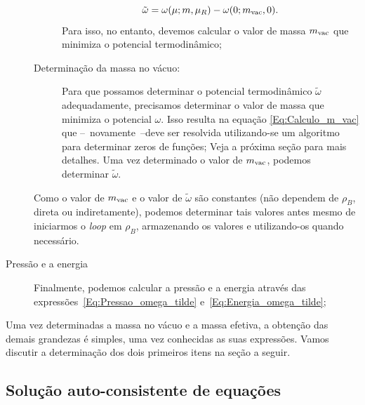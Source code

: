 \begin{description}
\begin{description}
							\begin{equation}
					\tilde\omega = \omega(\mu;m,\mu_R) - \omega(0;m_{\rm{vac}},0).
				\end{equation}
				Para isso, no entanto, devemos calcular o valor de massa $m_{\rm{vac}}$ que minimiza o potencial termodinâmico;
			\item[Determinação da massa no vácuo:] Para que possamos determinar o potencial termodinâmico $\tilde\omega$ adequadamente, precisamos determinar o valor de massa que minimiza o potencial $\omega$. Isso resulta na equação \ref{Eq:Calculo_m_vac} que --~novamente~--deve ser resolvida utilizando-se um algoritmo para determinar zeros de funções; Veja a próxima seção para mais detalhes. Uma vez determinado o valor de $m_{\rm{vac}}$, podemos determinar $\tilde\omega$.
		\end{description}	
		Como o valor de $m_{\rm{vac}}$ e o valor de $\tilde\omega$ são constantes (não dependem de $\rho_B$, direta ou indiretamente), podemos determinar tais valores antes mesmo de iniciarmos o \emph{loop} em $\rho_B$, armazenando os valores e utilizando-os quando necessário.
	\item[Pressão e a energia] Finalmente, podemos calcular a pressão e a energia através das expressões~\eqref{Eq:Pressao_omega_tilde} e~\eqref{Eq:Energia_omega_tilde};
\end{description}
%
Uma vez determinadas a massa no vácuo e a massa efetiva, a obtenção das demais grandezas é simples, uma vez conhecidas as suas expressões. Vamos discutir a determinação dos dois primeiros itens na seção a seguir. 

\subsection{Solução auto-consistente de equações}


